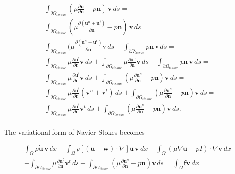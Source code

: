 \documentclass[11pt,a4paper,titlepage]{report}
\begin{document}
\begin{align*}
& \int_{\partial \Omega_{tissue}} (\mu \frac{\partial \mathbf{u}}{\partial \mathbf{n}} -  p \mathbf{n}) \, \mathbf{v} \, ds = \\
& \int_{\partial \Omega_{tissue}} (\mu \frac{\partial (\mathbf{u}^n + \mathbf{u}^t)}{\partial \mathbf{n}} -  p \mathbf{n}) \, \mathbf{v} \, ds = \\
& \int_{\partial \Omega_{tissue}} (\mu \frac{\partial (\mathbf{u}^n + \mathbf{u}^t)  }{\partial \mathbf{n}} \mathbf{v} \,ds - \int_{\partial \Omega_{tissue}} p \mathbf{n} \, \mathbf{v} \, ds = \\
& \int_{\partial \Omega_{tissue}} \mu \frac{\partial \mathbf{u}^t}{\partial \mathbf{n}} \mathbf{v} \, ds
+ \int_{\partial \Omega_{tissue}} \mu \frac{\partial \mathbf{u}^n}{\partial \mathbf{n}} \mathbf{v} \, ds
- \int_{\partial \Omega_{tissue}} p \mathbf{n} \, \mathbf{v} \, ds = \\
& \int_{\partial \Omega_{tissue}} \mu \frac{\partial \mathbf{u}^t}{\partial \mathbf{n}} \mathbf{v} \, ds 
+ \int_{\partial \Omega_{tissue}} ( \mu \frac{\partial \mathbf{u}^n}{\partial \mathbf{n}} - p \mathbf{n} ) \mathbf{v} \, ds = \\
& \int_{\partial \Omega_{tissue}} \mu \frac{\partial \mathbf{u}^t}{\partial \mathbf{n}} (\mathbf{v}^n + \mathbf{v}^t) \, ds 
+ \int_{\partial \Omega_{tissue}} ( \mu \frac{\partial \mathbf{u}^n}{\partial \mathbf{n}} - p \mathbf{n} ) \mathbf{v} \, ds = \\
& \int_{\partial \Omega_{tissue}} \mu \frac{\partial \mathbf{u}^t}{\partial \mathbf{n}} \mathbf{v}^t \, ds 
+ \int_{\partial \Omega_{tissue}} ( \mu \frac{\partial \mathbf{u}^n}{\partial \mathbf{n}} - p \mathbf{n} ) \mathbf{v} \, ds. \\
\end{align*}


The variational form of Navier-Stokes becomes

\begin{align*}
 \int_{\Omega} \rho \dot{\mathbf{u}} \, \mathbf{v} \, dx
+ \int_{\Omega} \rho [(\mathbf{u - w}) \cdot \nabla] \mathbf{u} \, \mathbf{v} \, dx
+ \int_{\Omega} (\mu \nabla \mathbf{u} - pI) \cdot \nabla \mathbf{v} \, dx \\
- \int_{\partial \Omega_{tissue}} \mu \frac{\partial \mathbf{u}^t}{\partial \mathbf{n}} \mathbf{v}^t \, ds 
- \int_{\partial \Omega_{tissue}} ( \mu \frac{\partial \mathbf{u}^n}{\partial \mathbf{n}} - p \mathbf{n} ) \mathbf{v} \, ds
= \int_{\Omega} \mathbf{f} \mathbf{v} \, dx
\end{align*}
\end{document}
